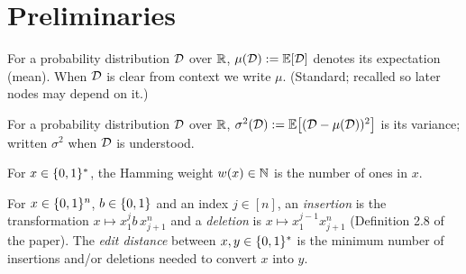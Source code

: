 %
%

\chapter{Preliminaries}


\begin{definition}
  \label{def:mean}
  \mathlibok
  For a probability distribution $\mathcal{D}$ over $\mathbb{R}$, $\mu(\mathcal{D}) := \mathbb{E}[\mathcal{D}]$
  denotes its expectation (mean). When $\mathcal{D}$ is clear from context we write
  $\mu$. (Standard; recalled so later nodes may depend on it.)
\end{definition}

\begin{definition}
  \label{def:variance}
  \mathlibok
  For a probability distribution $\mathcal{D}$ over $\mathbb{R}$,
  $\sigma^2(\mathcal{D}) := \mathbb{E}\big[(\mathcal{D}-\mu(\mathcal{D}))^2\big]$ is its variance; written
  $\sigma^2$ when $\mathcal{D}$ is understood.
\end{definition}

\begin{definition}
  \label{def:hamming-weight}
  \mathlibok
  For $x \in \{0,1\}^*$, the Hamming weight $w(x) \in \mathbb{N}$ is the number of ones
  in $x$.
\end{definition}

\begin{definition}
  \label{def:edit-distance}
  \mathlibok
  For $x \in \{0,1\}^n$, $b \in \{0,1\}$ and an index $j \in [n]$, an
  \emph{insertion} is the transformation $x \mapsto x_1^j b\, x_{j+1}^n$ and a
  \emph{deletion} is $x \mapsto x_1^{j-1} x_{j+1}^n$ (Definition 2.8 of the
  paper). The \emph{edit distance} between $x,y \in \{0,1\}^*$ is the minimum
  number of insertions and/or deletions needed to convert $x$ into $y$.
\end{definition}

